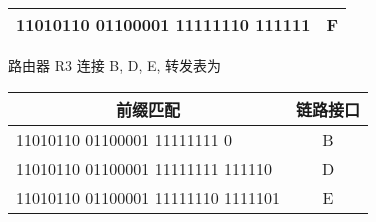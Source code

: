 \documentclass[11pt]{homework}
\begin{document}
{\begin{alphaparts}
\begin{center}
\begin{tabular}{|l|c|}
                11010110 01100001 11111110 111111  & F        \\ \hline
            \end{tabular}
        \end{center}
        路由器 R3 连接 B, D, E, 转发表为
        \begin{center}
            \begin{tabular}{|l|c|}
                \hline
                \multicolumn{1}{|c|}{前缀匹配}     & 链路接口 \\ \hline
                11010110 01100001 11111111 0       & B        \\ \hline
                11010110 01100001 11111111 111110  & D        \\ \hline
                11010110 01100001 11111110 1111101 & E        \\ \hline
            \end{tabular}
        \end{center}
    \end{alphaparts}
}

\end{document}
